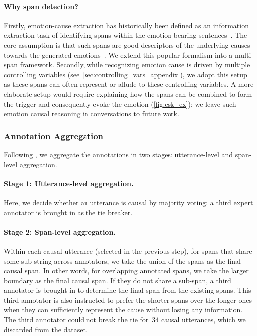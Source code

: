 \documentclass[11pt,a4paper]{article}
\theoremstyle{definition}
\begin{document}
\paragraph{Why span detection?}
Firstly, emotion-cause extraction has historically been defined as an information extraction task of identifying spans within the emotion-bearing sentences~\cite{DBLP:conf/acl/XiaD19,DBLP:conf/cicling/GhaziIS15}. The core assumption is that such spans are good descriptors of the underlying causes towards the generated emotions~\cite{talmy2000toward}. We extend this popular formalism into a multi-span framework.
Secondly, while recognizing emotion cause is driven by multiple controlling variables (see~\cref{sec:controlling_vars_appendix}), we adopt this setup as these spans can often represent or allude to these controlling variables. A more elaborate setup would require explaining how the spans can be combined to form the trigger and consequently evoke the emotion (\cref{fig:csk_ex}); we leave such emotion causal reasoning in conversations to future work.

\subsubsection{Annotation Aggregation}
Following \citet{gui2016event}, we aggregate the annotations in two stages: utterance-level and span-level aggregation.

\paragraph{Stage 1: Utterance-level aggregation.}
Here, we decide whether an utterance is causal by majority voting: a third expert annotator is brought in as the tie breaker.

\paragraph{Stage 2: Span-level aggregation.}
Within each causal utterance (selected in the previous step), for spans that share some sub-string across annotators, we take the union of the spans as the final causal span. In other words, for overlapping annotated spans, we take the larger boundary as the final causal span. If they do not share a sub-span, a third annotator is brought in to determine the final span from the existing spans. This third annotator is also instructed to prefer the shorter spans over the longer ones when they can sufficiently represent the cause without losing any information.
The third annotator could not break the tie for~34 causal utterances, which we discarded from the dataset.
\end{document}
